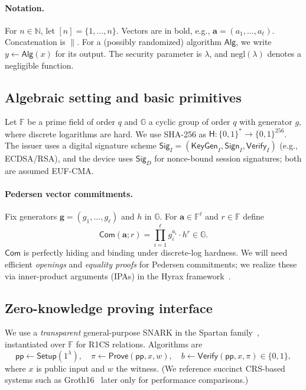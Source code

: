 \paragraph{Notation.}
For $n\in\mathbb{N}$, let $[n]=\{1,\dots,n\}$.
Vectors are in bold, e.g., $\mathbf{a}=(a_1,\ldots,a_\ell)$.
Concatenation is $\|$.
For a (possibly randomized) algorithm $\mathsf{Alg}$, we write $y \leftarrow \mathsf{Alg}(x)$ for its output.
The security parameter is $\lambda$, and $\mathrm{negl}(\lambda)$ denotes a negligible function.
\subsection{Algebraic setting and basic primitives}
\label{subsec:algebra}
Let $\mathbb{F}$ be a prime field of order $q$ and $\mathbb{G}$ a cyclic group of order $q$ with generator $g$, where discrete logarithms are hard.
We use SHA\mbox{-}256 as $\mathsf{H}:\{0,1\}^\ast\!\rightarrow\!\{0,1\}^{256}$.
The issuer uses a digital signature scheme $\mathsf{Sig}_I=(\mathsf{KeyGen}_I,\mathsf{Sign}_I,\mathsf{Verify}_I)$ (e.g., ECDSA/RSA), and the device uses $\mathsf{Sig}_D$ for nonce-bound session signatures; both are assumed EUF\mbox{-}CMA.

\paragraph{Pedersen vector commitments.}
Fix generators $\mathbf{g}=(g_1,\ldots,g_\ell)$ and $h$ in $\mathbb{G}$.
For $\mathbf{a}\in\mathbb{F}^\ell$ and $r\in\mathbb{F}$ define
\[
\mathsf{Com}(\mathbf{a};r)=\prod_{i=1}^{\ell} g_i^{a_i}\cdot h^{r}\in\mathbb{G}.
\]
$\mathsf{Com}$ is perfectly hiding and binding under discrete\mbox{-}log hardness.
We will need efficient \emph{openings} and \emph{equality proofs} for Pedersen commitments; we realize these via inner-product arguments (IPAs) in the Hyrax framework~\cite{SP:WTSTW18}.

\subsection{Zero-knowledge proving interface}
\label{subsec:zk-interface}
We use a \emph{transparent} general-purpose SNARK in the Spartan family~\cite{C:Setty20}, instantiated over $\mathbb{F}$ for R1CS relations.
Algorithms are
\[
\mathsf{pp} \leftarrow \mathsf{Setup}(1^\lambda),\quad
\pi \leftarrow \mathsf{Prove}(\mathsf{pp},x,w),\quad
b \leftarrow \mathsf{Verify}(\mathsf{pp},x,\pi)\in\{0,1\},
\]
where $x$ is public input and $w$ the witness.
(We reference succinct CRS-based systems such as Groth16~\cite{groth2016size} later only for performance comparisons.)

